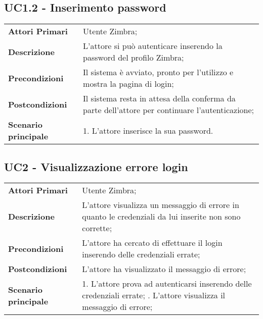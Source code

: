 \subsection{UC1.2 - Inserimento password}
	\begin{center}
	\bgroup
	\def\arraystretch{1.8}     
	\begin{longtable}{  p{4cm} | p{9.5cm} } 
		\textbf{Attori Primari} & Utente Zimbra; \\ 
		\textbf{Descrizione} & L’attore si può autenticare inserendo la password del profilo Zimbra; \\ 
		\textbf{Precondizioni}  & Il sistema è avviato, pronto per l’utilizzo e mostra la pagina di login; \\
		\textbf{Postcondizioni} & Il sistema resta in attesa della conferma da parte dell'attore per continuare l'autenticazione;  \\ 
		\textbf{Scenario principale} & 
		1. L’attore inserisce la sua password.
	\end{longtable}
	\egroup
\end{center}

\subsection{UC2 - Visualizzazione errore login} \label{UC2}
	\begin{center}
	\bgroup
	\def\arraystretch{1.8}     
	\begin{longtable}{  p{4cm} | p{9.5cm} } 
		\textbf{Attori Primari} & Utente Zimbra; \\ 
		\textbf{Descrizione} &  L'attore visualizza un messaggio di errore in quanto le credenziali da lui inserite non sono corrette; \\ 
		\textbf{Precondizioni}  & L'attore ha cercato di effettuare il login inserendo delle credenziali errate; \\
		\textbf{Postcondizioni} & L'attore ha visualizzato il messaggio di errore;  \\ 
		\textbf{Scenario principale} & 
		1. L'attore prova ad autenticarsi inserendo delle credenziali errate; \newline
		2. L'attore visualizza il messaggio di errore;
	\end{longtable}
	\egroup
\end{center}


